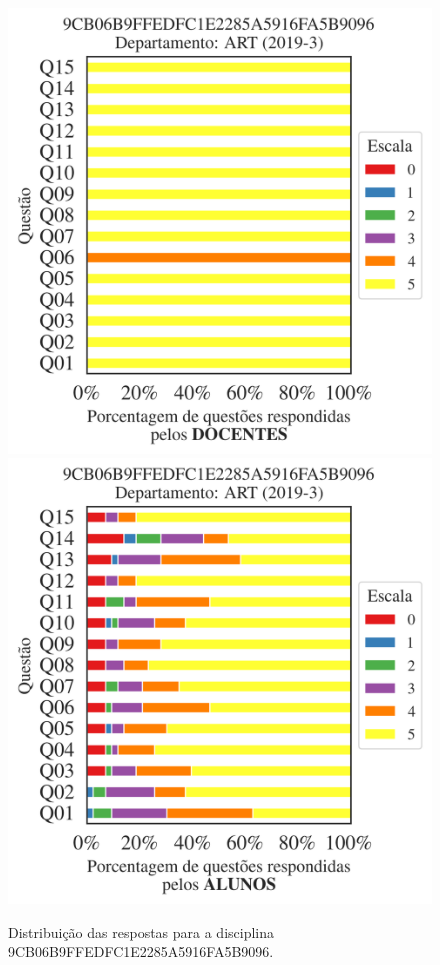 \documentclass[a4paper,10pt]{article}
\begin{document}
\begin{figure}[h]
\centering
\includegraphics[width=0.485\linewidth]{analise_disciplina_departamento_ART_9CB06B9FFEDFC1E2285A5916FA5B9096_docentes.png}
\includegraphics[width=0.485\linewidth]{analise_disciplina_departamento_ART_9CB06B9FFEDFC1E2285A5916FA5B9096_alunos.png}
\caption{\label{fig:analise_geral_departamento}                Distribuição das respostas para a disciplina 9CB06B9FFEDFC1E2285A5916FA5B9096. }
\end{figure}
\end{document}
